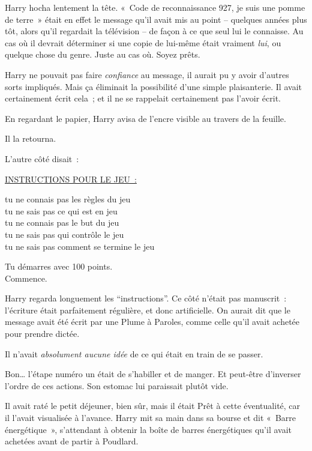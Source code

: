Harry hocha lentement la tête. «~Code de reconnaissance 927, je suis une pomme de terre~» était en effet le message qu'il avait mis au point -- quelques années plus tôt, alors qu'il regardait la télévision -- de façon à ce que seul lui le connaisse. Au cas où il devrait déterminer si une copie de lui-même était vraiment \emph{lui}, ou quelque chose du genre. Juste au cas où. Soyez prêts.

Harry ne pouvait pas faire \emph{confiance} au message, il aurait pu y avoir d'autres sorts impliqués. Mais ça éliminait la possibilité d'une simple plaisanterie. Il avait certainement écrit cela~; et il ne se rappelait certainement pas l'avoir écrit.

En regardant le papier, Harry avisa de l'encre visible au travers de la feuille.

Il la retourna.

L'autre côté disait~:

\begin{writtenNote}\centering
\textsc{\underline{INSTRUCTIONS POUR LE JEU~:}}

tu ne connais pas les règles du jeu\\
tu ne sais pas ce qui est en jeu\\
tu ne connais pas le but du jeu\\
tu ne sais pas qui contrôle le jeu\\
tu ne sais pas comment se termine le jeu


Tu démarres avec 100 points.\\
Commence.
\end{writtenNote}

Harry regarda longuement les “instructions”. Ce côté n'était pas manuscrit~: l'écriture était parfaitement régulière, et donc artificielle. On aurait dit que le message avait été écrit par une Plume à Paroles, comme celle qu'il avait achetée pour prendre dictée.

Il n'avait \emph{absolument aucune idée} de ce qui était en train de se passer.

Bon… l'étape numéro un était de s'habiller et de manger. Et peut-être d'inverser l'ordre de ces actions. Son estomac lui paraissait plutôt vide.

Il avait raté le petit déjeuner, bien sûr, mais il était Prêt à cette éventualité, car il l'avait visualisée à l'avance. Harry mit sa main dans sa bourse et dit «~Barre énergétique~», s'attendant à obtenir la boîte de barres énergétiques qu'il avait achetées avant de partir à Poudlard.

